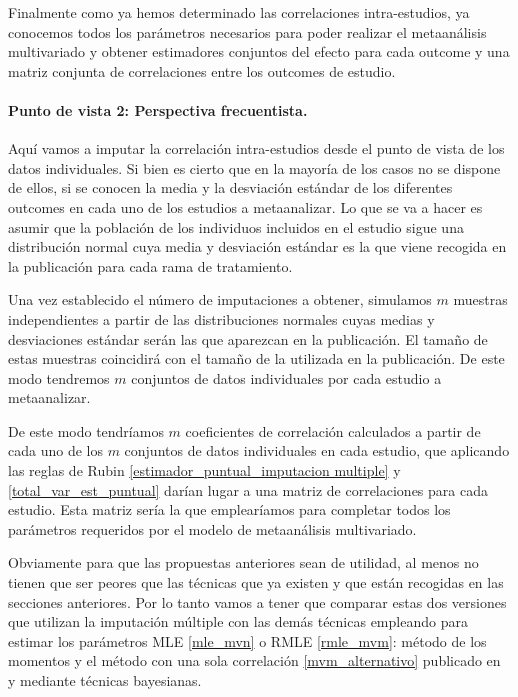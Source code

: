 \documentclass[a4paper,openright,12pt]{report}
\begin{document}
Finalmente como ya hemos determinado las correlaciones intra-estudios, ya conocemos todos los parámetros necesarios para poder realizar el metaanálisis multivariado y obtener estimadores conjuntos del efecto para cada outcome y una matriz conjunta de correlaciones entre los outcomes de estudio.

\paragraph{Punto de vista 2: Perspectiva frecuentista.}
Aquí vamos a imputar la correlación intra-estudios desde el punto de vista de los datos individuales. Si bien es cierto que en la mayoría de los casos no se dispone de ellos, si se conocen la media y la desviación estándar de los diferentes outcomes en cada uno de los estudios a metaanalizar. Lo que se va a hacer es asumir que la población de los individuos incluidos en el estudio sigue una distribución normal cuya media y desviación estándar es la que viene recogida en la publicación para cada rama de tratamiento.

Una vez establecido el número de imputaciones a obtener, simulamos $m$ muestras independientes a partir de las distribuciones normales cuyas medias y desviaciones estándar serán las que aparezcan en la publicación. El tamaño de estas muestras coincidirá con el tamaño de la utilizada en la publicación. De este modo tendremos $m$ conjuntos de datos individuales por cada estudio a metaanalizar.

De este modo tendríamos $m$ coeficientes de correlación calculados a partir de cada uno de los $m$ conjuntos de datos individuales en cada estudio, que aplicando las reglas de Rubin \ref{estimador_puntual_imputacion multiple} y \ref{total_var_est_puntual} darían lugar a una matriz de correlaciones para cada estudio. Esta matriz sería la que emplearíamos para completar todos los parámetros requeridos por el modelo de metaanálisis multivariado.

Obviamente para que las propuestas anteriores sean de utilidad, al menos no tienen que ser peores que las técnicas que ya existen y que están recogidas en las secciones anteriores. Por lo tanto vamos a tener que comparar estas dos versiones que utilizan la imputación múltiple con las demás técnicas empleando para estimar los parámetros MLE \ref{mle_mvn} o RMLE \ref{rmle_mvm}: método de los momentos \cite{Jackson2010} y el método con una sola correlación \ref{mvm_alternativo} publicado en \cite{Riley2009} y mediante técnicas bayesianas. 
\end{document}
